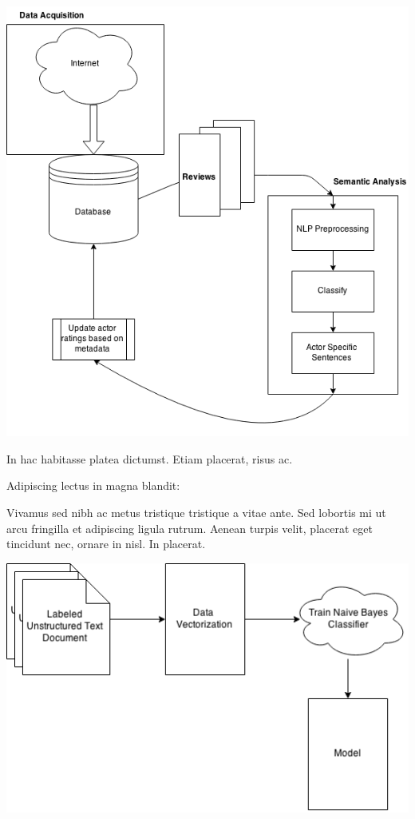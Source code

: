 \documentclass[a0,portrait]{a0poster}
\begin{document}
\begin{multicols}{2}
\begin{center}\vspace{1cm}
\includegraphics[width=0.8\linewidth]{flow2}
\end{center}\vspace{1cm}

In hac habitasse platea dictumst. Etiam placerat, risus ac.

Adipiscing lectus in magna blandit:



Vivamus sed nibh ac metus tristique tristique a vitae ante. Sed lobortis mi ut arcu fringilla et adipiscing ligula rutrum. Aenean turpis velit, placerat eget tincidunt nec, ornare in nisl. In placerat.

\begin{center}\vspace{1cm}
\includegraphics[width=0.8\linewidth]{sentiment}
\end{center}\vspace{1cm}


\end{multicols}
\end{document}
